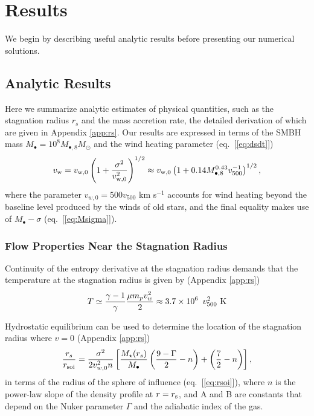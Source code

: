\documentclass[usenatbib,fleqn]{mn2e}
\newcommand{\rs}{r_s}
\newcommand{\Mstar}{M_{\star}}
\newcommand{\Mbh}[1][]{M_{\bullet#1}}
\newcommand{\Mbheight}{M_{\bullet,8}}
\newcommand{\soi}{\rm soi}
\newcommand{\rsoi}{r_{\soi}}
\newcommand{\vwO}{v_{w,0}}
\begin{document}
\section{Results}

We begin by describing useful analytic results before presenting our numerical solutions.  

\label{sec:results}
\subsection{Analytic Results}

Here we summarize analytic estimates of physical quantities, such as the stagnation radius $\rs$ and the mass accretion rate, the detailed derivation of which are given in Appendix \ref{app:rs}.  Our results are expressed in terms of the SMBH mass $M_{\bullet} = 10^{8}M_{\bullet,8}M_{\odot}$ and the wind heating parameter (eq.~[\ref{eq:dsdt}])
\begin{eqnarray}
v_{\rm w} = v_{\rm w,0}\left(1+\frac{\sigma^{2}}{v_{\rm w,0}^{2}}\right)^{1/2} 
 \approx v_{\rm w,0}\left(1+0.14 \Mbheight^{0.43}v_{500}^{-1}\right)^{1/2},
\end{eqnarray}
where the parameter $\vwO = 500 v_{500}$ km s$^{-1}$ accounts for wind heating beyond the baseline level produced by the winds of old stars, and the final equality makes use of $M_{\bullet}-\sigma$ (eq.~[\ref{eq:Msigma}]).

\subsubsection{Flow Properties Near the Stagnation Radius}

Continuity of the entropy derivative at the stagnation radius demands that the temperature at the stagnation radius is given by (Appendix \ref{app:rs})
\begin{align}
T \simeq \frac{\gamma-1}{\gamma}\frac{\mu m_p v_{w}^{2}}{2} \approx 3.7
\times 10^6\ \, v_{500}^2 \,\,{\rm K} 
\label{eq:Tanalytic}
\end{align}

Hydrostatic equilibrium can be used to determine the location of the stagnation radius where $v = 0$ (Appendix \ref{app:rs})
\begin{align}
  \frac{\rs}{\rsoi}=\frac{\sigma^{2}}{2 v_{w,0}^{2} n}\left[
   \frac{\Mstar(\rs)}{\Mbh}\left(\frac{9-\Gamma}{2}-n\right)+\left(\frac{7}{2}-n\right)\right],
 \label{eq:stag_analytic}
\end{align}
in terms of the radius of the sphere of influence (eq.~[\ref{eq:rsoi}]), where $n$ is the power-law slope of the
density profile at $r = r_{\rm s}$, and A and B are constants that depend on the Nuker
parameter $\Gamma$ and the adiabatic index of the gas.
\end{document}
